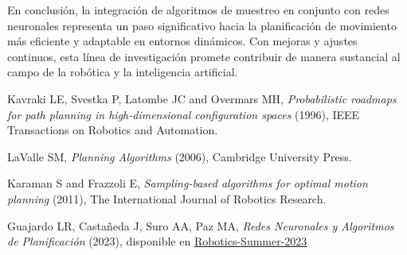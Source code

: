 \documentclass[spanish,mexico]{article}
\numberwithin{equation}{section}
\theoremstyle{definition}
\theoremstyle{remark}
\begin{document}
En conclusión, la integración de algoritmos de muestreo en conjunto con redes neuronales representa un paso significativo hacia la planificación de movimiento más eficiente y adaptable en entornos dinámicos. Con mejoras y ajustes continuos, esta línea de investigación promete contribuir de manera sustancial al campo de la robótica y la inteligencia artificial. 

\newpage
\begin{thebibliography}{9}
    Kavraki LE, Svestka P, Latombe JC and Overmars MH,
    \emph{Probabilistic roadmaps for path planning in high-dimensional
configuration spaces} (1996),
    IEEE Transactions on Robotics and Automation.

    LaValle SM,
    \emph{Planning Algorithms} (2006),
    Cambridge University Press.
    
    Karaman S and Frazzoli E,
    \emph{Sampling-based algorithms for optimal motion planning} (2011),
    The International Journal of Robotics Research.
    
    Guajardo LR, Castañeda J, Suro AA, Paz MA,
    \emph{Redes Neuronales y Algoritmos de Planificación} (2023),
    disponible en \href{https://github.com/RamonGuajardo1017/Robotics-Summer-2023}{Robotics-Summer-2023}
\end{thebibliography}
\end{document}
